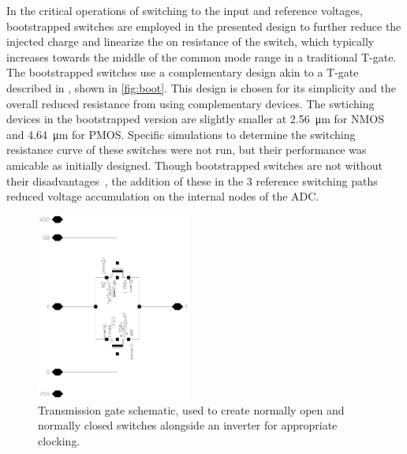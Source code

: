 \documentclass[11pt,letterpaper]{article}
\begin{document}
In the critical operations of switching to the input and reference voltages, bootstrapped switches are employed in the presented design to further reduce the injected charge and linearize the on resistance of the switch, which typically increases towards the middle of the common mode range in a traditional T-gate\cite{Razavi2015,Bocharov2019}. The bootstrapped switches use a complementary design akin to a T-gate described in \cite{Sotoudeh2021}, shown in \cref{fig:boot}. This design is chosen for its simplicity and the overall reduced resistance from using complementary devices. The swtiching devices in the bootstrapped version are slightly smaller at \qty{2.56}{\um} for NMOS and \qty{4.64}{\um} for PMOS\@. Specific simulations to determine the switching resistance curve of these switches were not run, but their performance was amicable as initially designed. Though bootstrapped switches are not without their disadvantages~\cite{Yuan2021}, the addition of these in the 3 reference switching paths reduced voltage accumulation on the internal nodes of the ADC. 

\begin{figure}[htbp!]
		\centering
		\includegraphics[width=2in]{images/sch_tg.eps}
		\caption{Transmission gate schematic, used to create normally open and normally closed switches alongside an inverter for appropriate clocking.}\label{fig:tg}
\end{figure}
\end{document}
